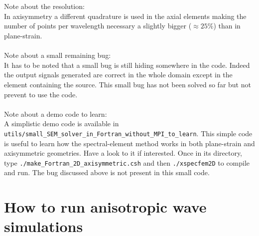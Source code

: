 \\\\
Note about the resolution:\\
In axisymmetry a different quadrature is used in the axial elements making the number of points per wavelength necessary a slightly
bigger ($\approx 25\%$) than in plane-strain.
\\\\
Note about a small remaining bug:\\
It has to be noted that a small bug is still hiding somewhere in the code. Indeed the output signals generated are correct in the
whole domain except in the element containing the source. This small bug has not been solved so far but not prevent to use the code.
\\\\
Note about a demo code to learn:\\
A simplistic demo code is available in \\ \texttt{utils/small\_SEM\_solver\_in\_Fortran\_without\_MPI\_to\_learn}.
This simple code is useful to learn how the spectral-element method works in both plane-strain and axisymmetric geometries.
Have a look to it if interested. Once in its directory, type \texttt{./make\_Fortran\_2D\_axisymmetric.csh} and then \texttt{./xspecfem2D}
to compile and run. The bug discussed above is not present in this small code.

\section{How to run anisotropic wave simulations}

